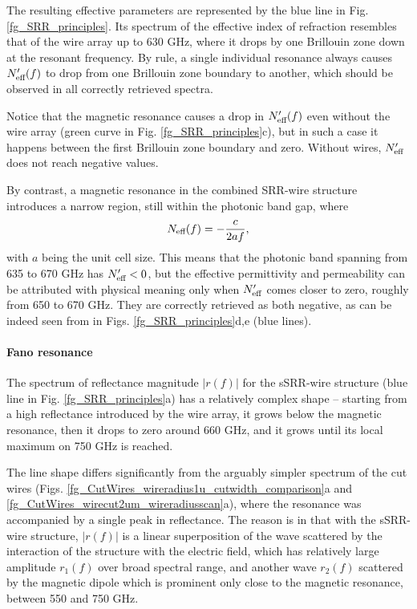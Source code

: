The resulting effective parameters are represented by the blue line in Fig. \ref{fg_SRR_principles}. Its spectrum of the effective index of refraction resembles that of the wire array up to 630 GHz, where it drops by one Brillouin zone down at the resonant frequency.
By rule, a single individual resonance always causes $N_{\text{eff} }'(f)$ to drop from one Brillouin zone boundary to another, which should be observed in all correctly retrieved spectra. 

Notice that the magnetic resonance causes a drop in $N_{\text{eff} }'(f)$ even without the wire array (green curve in Fig. \ref{fg_SRR_principles}c), but in such a case it happens between the first Brillouin zone boundary and zero. Without wires, $N_{\text{eff} }'$ does not reach negative values.

By contrast, a magnetic resonance in the combined SRR-wire structure introduces a narrow region, still within the photonic band gap, where 
\begin{equation} N_{\text{eff} }(f) = -\frac{c}{2 a f}, \label{eq_BZN2}\end{equation}
with $a$ being the unit cell size.	
This means that the photonic band spanning from 635 to 670 GHz has $N_{\text{eff} }'<0$, but the effective permittivity and permeability can be attributed with physical meaning only when $N_{\text{eff} }'$ comes closer to zero, roughly from 650 to 670 GHz. They are correctly retrieved as both negative, as can be indeed seen from in Figs. \ref{fg_SRR_principles}d,e (blue lines).

\paragraph{Fano resonance} %
The spectrum of reflectance magnitude $|r(f)|$ for the sSRR-wire structure (blue line in Fig. \ref{fg_SRR_principles}a) has a relatively complex shape -- starting from a high reflectance introduced by the wire array, it grows below the magnetic resonance, then it drops to zero around 660 GHz, and it grows until its local maximum on 750 GHz is reached.

The line shape differs significantly from the arguably simpler spectrum of the cut wires (Figs. \ref{fg_CutWires_wireradius1u_cutwidth_comparison}a and \ref{fg_CutWires_wirecut2um_wireradiusscan}a), where the resonance was accompanied by a single peak in reflectance. 
The reason is in that with the sSRR-wire structure, $|r(f)|$ is a linear superposition of the wave scattered by the interaction of the structure with the electric field, which has relatively large amplitude $r_{1}(f)$ over broad spectral range, and another wave $r_{2}(f)$ scattered by the magnetic dipole which is prominent only close to the magnetic resonance, between 550 and 750 GHz.

